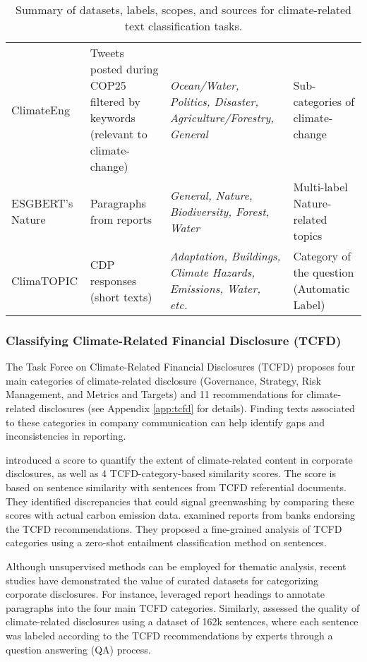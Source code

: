 \begin{table}[ht]
\begin{tabular}{p{3cm}p{3cm}p{3cm}p{5cm}}
ClimateEng \cite{vaid-etal-2022-towards}  & Tweets posted during COP25 filtered by keywords (relevant to climate-change)  & \textit{Ocean/Water, Politics, Disaster, Agriculture/Forestry, General} & Sub-categories of climate-change\\
ESGBERT's Nature \cite{Schimanski2024nature} & Paragraphs from reports  & \textit{General, Nature, Biodiversity, Forest, Water} & Multi-label Nature-related topics                   \\
ClimaTOPIC \cite{spokoyny2023answering} & CDP responses (short texts) & \textit{Adaptation, Buildings, Climate Hazards, Emissions, Water, etc.} & Category of the question (Automatic Label)          \\
\bottomrule
\end{tabular}
\caption{Summary of datasets, labels, scopes, and sources for climate-related text classification tasks.}
\label{tab:datasets_subtopic}
\end{table}


\subsubsection{Classifying Climate-Related Financial Disclosure (TCFD)}
\label{sec: tcfd}

The Task Force on Climate-Related Financial Disclosures (TCFD) proposes four main categories of climate-related disclosure (Governance, Strategy, Risk Management, and Metrics and Targets) and 11 recommendations for climate-related disclosures (see Appendix \ref{app:tcfd} for details). Finding texts associated to these categories in company communication can help identify
gaps and inconsistencies in reporting.

\zeroshot \citet{dingCarbonEmissionsTCFD2023} introduced a score to quantify the extent of climate-related content in corporate disclosures, as well as 4 TCFD-category-based similarity scores. The score is based on sentence similarity with sentences from TCFD referential documents. They identified discrepancies that could signal greenwashing by comparing these scores with actual carbon emission data. \citet{auzepy_evaluating_2023} examined reports from banks endorsing the TCFD recommendations. They proposed a fine-grained analysis of TCFD categories using a zero-shot entailment classification method on sentences.

\datasets Although unsupervised methods can be employed for thematic analysis, recent studies have demonstrated the value of curated datasets for categorizing corporate disclosures. For instance, \citet{bingler_cheap_2021} leveraged report headings to annotate paragraphs into the four main TCFD categories. Similarly, \citet{sampson_tcfd-nlp_nodate} assessed the quality of climate-related disclosures using a dataset of 162k sentences, where each sentence was labeled according to the TCFD recommendations by experts through a question answering (QA) process.

